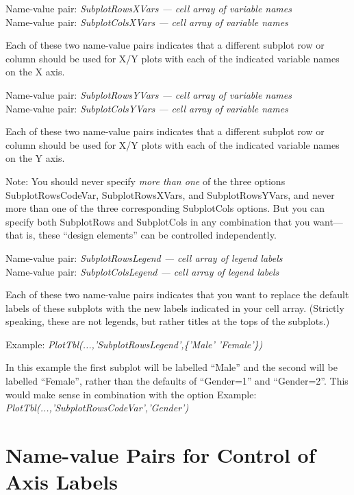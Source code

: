 \documentclass{article}
\newcommand{\example}[1]{Example: {\it #1}}
\newcommand{\namevalue}[2]{{\it #1 --- #2}}
\begin{document}
Name-value pair: \namevalue{SubplotRowsXVars}{cell array of variable names} \\
Name-value pair: \namevalue{SubplotColsXVars}{cell array of variable names}

Each of these two name-value pairs indicates that a different subplot row or column should
be used for X/Y plots with each of the indicated variable names on the X axis.

Name-value pair: \namevalue{SubplotRowsYVars}{cell array of variable names} \\
Name-value pair: \namevalue{SubplotColsYVars}{cell array of variable names}

Each of these two name-value pairs indicates that a different subplot row or column should
be used for X/Y plots with each of the indicated variable names on the Y axis.

Note: You should never specify \emph{more than one} of the three options
SubplotRowsCodeVar, SubplotRowsXVars, and SubplotRowsYVars,
and never more than one of the three corresponding SubplotCols options.
But you can specify both SubplotRows and SubplotCols in any
combination that you want---that is, these ``design elements''
can be controlled independently.


Name-value pair: \namevalue{SubplotRowsLegend}{cell array of legend labels} \\
Name-value pair: \namevalue{SubplotColsLegend}{cell array of legend labels}

Each of these two name-value pairs indicates that you want to replace the default labels
of these subplots with the new labels indicated in your cell array.
(Strictly speaking, these are not legends, but rather titles at
the tops of the subplots.)

\example{PlotTbl(...,'SubplotRowsLegend',\{'Male' 'Female'\})}

In this example the first subplot will be labelled ``Male''
and the second will be labelled ``Female'', rather than the defaults of ``Gender=1'' and ``Gender=2''.
This would make sense in combination with the option
\example{PlotTbl(...,'SubplotRowsCodeVar','Gender')}

\section{Name-value Pairs for Control of Axis Labels}
\end{document}
